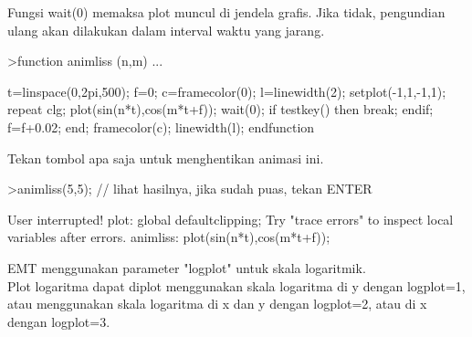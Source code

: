 \documentclass[a4paper,10pt]{article}
\begin{document}
\begin{eulernotebook}
\begin{eulercomment}
\begin{eulercomment}
\begin{eulercomment}
\begin{eulercomment}
\begin{eulercomment}
\begin{eulercomment}
\begin{eulercomment}
Fungsi wait(0) memaksa plot muncul di jendela grafis. Jika tidak,
pengundian ulang akan dilakukan dalam interval waktu yang jarang.
\end{eulercomment}
\begin{eulerprompt}
>function animliss (n,m) ...
\end{eulerprompt}
\begin{eulerudf}
  t=linspace(0,2pi,500);
  f=0;
  c=framecolor(0);
  l=linewidth(2);
  setplot(-1,1,-1,1);
  repeat
    clg;
    plot(sin(n*t),cos(m*t+f));
    wait(0);
    if testkey() then break; endif;
    f=f+0.02;
  end;
  framecolor(c);
  linewidth(l);
  endfunction
\end{eulerudf}
\begin{eulercomment}
Tekan tombol apa saja untuk menghentikan animasi ini.
\end{eulercomment}
\begin{eulerprompt}
>animliss(5,5); // lihat hasilnya, jika sudah puas, tekan ENTER
\end{eulerprompt}
\begin{euleroutput}
  User interrupted!
  plot:
      global defaultclipping;
  Try "trace errors" to inspect local variables after errors.
  animliss:
      plot(sin(n*t),cos(m*t+f));
\end{euleroutput}
\begin{eulercomment}
EMT menggunakan parameter "logplot" untuk skala logaritmik.\\
Plot logaritma dapat diplot menggunakan skala logaritma di y dengan
logplot=1, atau menggunakan skala logaritma di x dan y dengan
logplot=2, atau di x dengan logplot=3.


\end{eulercomment}
\end{eulercomment}
\end{eulercomment}
\end{eulercomment}
\end{eulercomment}
\end{eulercomment}
\end{eulercomment}
\end{eulernotebook}
\end{document}
